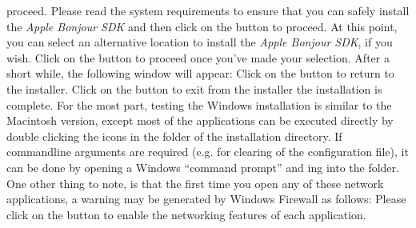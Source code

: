 proceed.
\condPage{}
Please read the system requirements to ensure that you can safely install the \emph{Apple
Bonjour SDK} and then click on the  button to proceed.
At this point, you can select an alternative location to install the \emph{Apple Bonjour
SDK}, if you wish.
Click on the  button to proceed once you've made your selection.
\condPage
After a short while, the following window will appear:
Click on the  button to return to the \mplusm{} installer.
Click on the  button to exit from the \mplusm{} installer \longDash{}
the installation is complete.
\condPage
{}
For the most part, testing the Windows installation is similar to the Macintosh version,
except most of the applications can be executed directly by double clicking the icons in
the  folder of the installation directory.
If command\longDash{}line arguments are required (e.g. for clearing of the \yarp{}
configuration file), it can be done by opening a Windows ``command prompt'' and
ing into the  folder.\\

One other thing to note, is that the first time you open any of these network
applications, a warning may be generated by Windows Firewall as follows:
Please click on the  button to enable the networking features of
each application.
\tertiaryEnd
\secondaryEnd
{}
\TBD
{}
\TBD
\tertiaryEnd
\secondaryEnd
\primaryEnd{}
